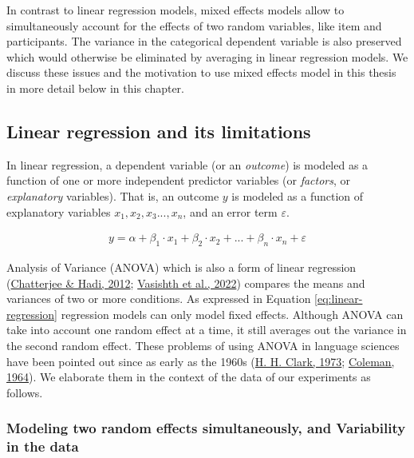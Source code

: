 \documentclass[a4paper, nobind]{templates/ociamthesis}
\begin{document}
In contrast to linear regression models, mixed effects models allow to simultaneously account for the effects of two random variables, like item and participants.
The variance in the categorical dependent variable is also preserved which would otherwise be eliminated by averaging in linear regression models.
We discuss these issues and the motivation to use mixed effects model in this thesis in more detail below in this chapter.

\hypertarget{linear-regression-and-its-limitations}{%
\subsection{Linear regression and its limitations}\label{linear-regression-and-its-limitations}}

In linear regression, a dependent variable (or an \emph{outcome}) is modeled as a function of one or more independent predictor variables (or \emph{factors}, or \emph{explanatory} variables).
That is, an outcome \(y\) is modeled as a function of explanatory variables \(x_1, x_2, x_3..., x_n\), and an error term \(\varepsilon\).

\begin{align} \label{eq:linear-regression}
y =
\alpha + 
\beta_{1}\cdot{x_1} + 
\beta_{2}\cdot{x_2} + ... +
\beta_{n}\cdot{x_n} + \varepsilon 
\end{align}

Analysis of Variance (ANOVA) which is also a form of linear regression (\protect\hyperlink{ref-Chatterjee2012}{Chatterjee \& Hadi, 2012}; \protect\hyperlink{ref-Vasishth2022}{Vasishth et al., 2022}) compares the means and variances of two or more conditions.
As expressed in Equation \eqref{eq:linear-regression} regression models can only model fixed effects.
Although ANOVA can take into account one random effect at a time, it still averages out the variance in the second random effect.
These problems of using ANOVA in language sciences have been pointed out since as early as the 1960s (\protect\hyperlink{ref-Clark1973}{H. H. Clark, 1973}; \protect\hyperlink{ref-Coleman1964}{Coleman, 1964}).
We elaborate them in the context of the data of our experiments as follows.

\hypertarget{modeling-two-random-effects-simultaneously-and-variability-in-the-data}{%
\subsubsection{Modeling two random effects simultaneously, and Variability in the data}\label{modeling-two-random-effects-simultaneously-and-variability-in-the-data}}
\end{document}
